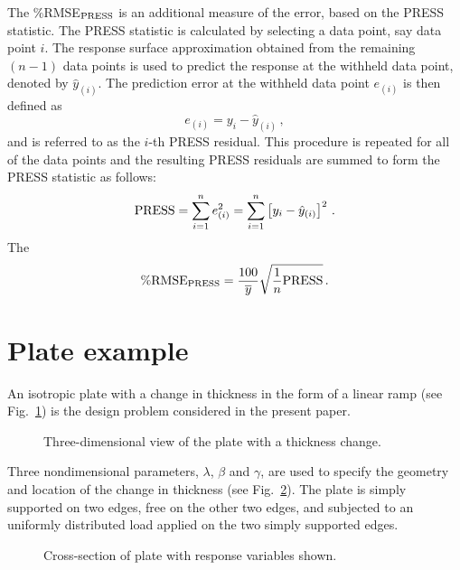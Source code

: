 \documentclass[stropt]{svjour}
\begin{document}
The \%RMSE$_{{\rm PRESS}}$ is an additional measure of the error, based on
the PRESS statistic.
The PRESS statistic is calculated by selecting a data point, say data point
$i$.
The response surface approximation obtained from the remaining $(n - 1)$ data
points is used to predict the response at the withheld data point, denoted by
$\hat{y}_{(i)}$.
The prediction error at the withheld data point $e_{(i)}$ is then defined as
\begin{equation}
e_{(i)}=y_i-\hat{y}_{(i)}\, ,   \label{eq13}
\end{equation}
and is referred to as the $i$-th PRESS residual.
This procedure is repeated for all of the data points and the resulting PRESS
residuals are summed to form the PRESS statistic as follows:
\begin{equation}
{\rm PRESS}=\sum\limits_{i=1}^{n}e^2_{(i)}
=\sum\limits_{i=1}^{n}\left\lbrack  y_i-\hat{y}_{(i)}\right\rbrack ^2\, .
\label{eq14}
\end{equation}
The %
\begin{equation}
{\rm \%RMSE}_{{\rm PRESS}}=\frac{100}{\overline{y}}
\sqrt{\frac1n{\rm PRESS}}\, .
\label{eq15}
\end{equation}


\section{Plate example}
\label{sec04}

An isotropic plate with a change in thickness in the form of a linear ramp
(see Fig.~\ref{fig:3}) is the design problem considered in the present paper.

\begin{figure}
\vspace{5cm}
\caption{Three-dimensional view of the plate with a thickness change.}
\label{fig:3}
\end{figure}

Three nondimensional parameters, $\lambda$, $\beta$ and $\gamma$, are used to
specify the geometry and location of the change in thickness
(see Fig.~\ref{fig:4}).
The plate is simply supported on two edges, free on the other two edges, and
subjected to an uniformly distributed load applied on the two simply supported
edges.

\begin{figure}
\vspace{5cm}
\caption{Cross-section of plate with response variables shown.}
\label{fig:4}
\end{figure}
\end{document}

